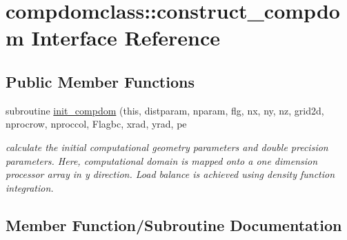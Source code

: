 \hypertarget{interfacecompdomclass_1_1construct__compdom}{}\section{compdomclass\+::construct\+\_\+compdom Interface Reference}
\label{interfacecompdomclass_1_1construct__compdom}
\subsection*{Public Member Functions}
\begin{DoxyCompactItemize}
\item 
subroutine \mbox{\hyperlink{interfacecompdomclass_1_1construct__compdom_a41290dc28d0207de5037fb58fb04ca2a}{init\+\_\+compdom}} (this, distparam, nparam, flg, nx, ny, nz, grid2d, nprocrow, nproccol, Flagbc, xrad, yrad, pe
\begin{DoxyCompactList}\small\item\em calculate the initial computational geometry parameters and double precision parameters. Here, computational domain is mapped onto a one dimension processor array in y direction. Load balance is achieved using density function integration. \end{DoxyCompactList}\end{DoxyCompactItemize}


\subsection{Member Function/\+Subroutine Documentation}
\mbox{\label{interfacecompdomclass_1_1construct__compdom_a41290dc28d0207de5037fb58fb04ca2a}} 
